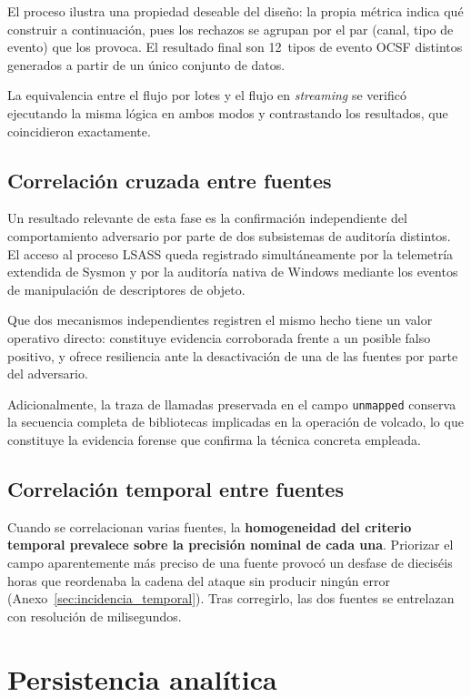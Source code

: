 El proceso ilustra una propiedad deseable del diseño: la propia métrica indica qué construir a
continuación, pues los rechazos se agrupan por el par (canal, tipo de evento) que los provoca.
El resultado final son 12~tipos de evento OCSF distintos generados a partir de un único
conjunto de datos.

La equivalencia entre el flujo por lotes y el flujo en \textit{streaming} se verificó
ejecutando la misma lógica en ambos modos y contrastando los resultados, que coincidieron
exactamente.

\subsection{Correlación cruzada entre fuentes}

Un resultado relevante de esta fase es la confirmación independiente del comportamiento
adversario por parte de dos subsistemas de auditoría distintos. El acceso al proceso LSASS
queda registrado simultáneamente por la telemetría extendida de Sysmon y por la auditoría
nativa de Windows mediante los eventos de manipulación de descriptores de objeto.

Que dos mecanismos independientes registren el mismo hecho tiene un valor operativo directo:
constituye evidencia corroborada frente a un posible falso positivo, y ofrece resiliencia
ante la desactivación de una de las fuentes por parte del adversario.

Adicionalmente, la traza de llamadas preservada en el campo \texttt{unmapped} conserva la
secuencia completa de bibliotecas implicadas en la operación de volcado, lo que constituye la
evidencia forense que confirma la técnica concreta empleada.

\subsection{Correlación temporal entre fuentes}

Cuando se correlacionan varias fuentes, la \textbf{homogeneidad del criterio temporal prevalece
sobre la precisión nominal de cada una}. Priorizar el campo aparentemente más preciso de una
fuente provocó un desfase de dieciséis horas que reordenaba la cadena del ataque sin producir
ningún error (Anexo~\ref{sec:incidencia_temporal}). Tras corregirlo, las dos fuentes se
entrelazan con resolución de milisegundos.

\section{Persistencia analítica}

